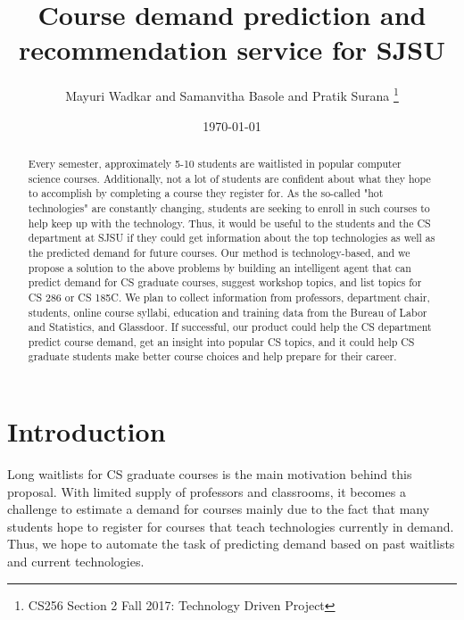 \documentclass{article}
\title{Course demand prediction and recommendation service for SJSU}
\author{Mayuri Wadkar and Samanvitha Basole and Pratik Surana
\thanks{CS256 Section 2 Fall 2017: Technology Driven Project}}
\date{\today}
\begin{document}
\maketitle
\begin{abstract}
Every semester, approximately 5-10 students are waitlisted in popular computer science courses. Additionally, not a lot of students are confident about what they hope to accomplish by completing a course they register for. As the so-called "hot technologies" are constantly changing, students are seeking to enroll in such courses to help keep up with the technology. Thus, it would be useful to the students and the CS department at SJSU if they could get information about the top technologies as well as the predicted demand for future courses. Our method is technology-based, and we propose a solution to the above problems by building an intelligent agent that can predict demand for CS graduate courses, suggest workshop topics, and list topics for CS 286 or CS 185C. We plan to collect information from professors, department chair, students, online course syllabi, education and training data from the Bureau of Labor and Statistics, and Glassdoor. If successful, our product could help the CS department predict course demand, get an insight into popular CS topics, and it could help CS graduate students make better course choices and help prepare for their career. 
\end{abstract}

\section{Introduction}

Long waitlists for CS graduate courses is the main motivation behind this proposal. With limited supply of professors and classrooms, it becomes a challenge to estimate a demand for courses mainly due to the fact that many students hope to register for courses that teach technologies currently in demand. Thus, we hope to automate the task of predicting demand based on past waitlists and current technologies. 



 
\end{document}

